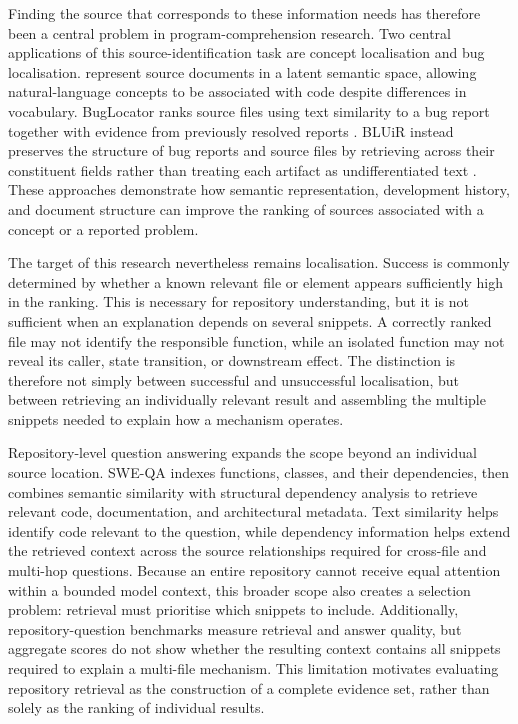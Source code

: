 Finding the source that corresponds to these information needs has therefore been a central problem in program-comprehension research. Two central applications of this source-identification task are concept localisation and bug localisation. \textcite{Marcus2004ConceptLocation} represent source documents in a latent semantic space, allowing natural-language concepts to be associated with code despite differences in vocabulary. BugLocator ranks source files using text similarity to a bug report together with evidence from previously resolved reports \textcite{Zhou2012BugLocator}. BLUiR instead preserves the structure of bug reports and source files by retrieving across their constituent fields rather than treating each artifact as undifferentiated text \textcite{Saha2013BLUiR}. These approaches demonstrate how semantic representation, development history, and document structure can improve the ranking of sources associated with a concept or a reported problem.

The target of this research nevertheless remains localisation. Success is commonly determined by whether a known relevant file or element appears sufficiently high in the ranking. This is necessary for repository understanding, but it is not sufficient when an explanation depends on several snippets. A correctly ranked file may not identify the responsible function, while an isolated function may not reveal its caller, state transition, or downstream effect. The distinction is therefore not simply between successful and unsuccessful localisation, but between retrieving an individually relevant result and assembling the multiple snippets needed to explain how a mechanism operates.

Repository-level question answering expands the scope beyond an individual source location. SWE-QA \textcite{Peng2026SWEQA} indexes functions, classes, and their dependencies, then combines semantic similarity with structural dependency analysis to retrieve relevant code, documentation, and architectural metadata. Text similarity helps identify code relevant to the question, while dependency information helps extend the retrieved context across the source relationships required for cross-file and multi-hop questions. Because an entire repository cannot receive equal attention within a bounded model context, this broader scope also creates a selection problem: retrieval must prioritise which snippets to include. Additionally, repository-question benchmarks measure retrieval and answer quality, but aggregate scores do not show whether the resulting context contains all snippets required to explain a multi-file mechanism. This limitation motivates evaluating repository retrieval as the construction of a complete evidence set, rather than solely as the ranking of individual results.

